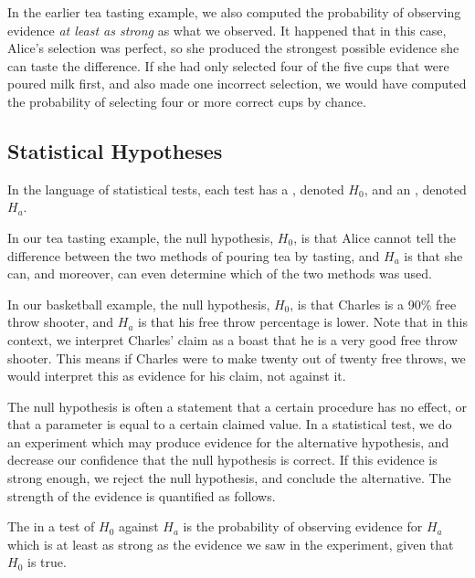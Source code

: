 \begin{note}
In the earlier tea tasting example, we also computed the probability of observing evidence \emph{at least as strong} as what we observed. It happened that in this case, Alice's selection was perfect, so she produced the strongest possible evidence she can taste the difference. If she had only selected four of the five cups that were poured milk first, and also made one incorrect selection, we would have computed the probability of selecting four or more correct cups by chance.
\end{note}

\subsection*{Statistical Hypotheses}

In the language of statistical tests, each test has a , denoted $H_0$, and an , denoted $H_a$.

In our tea tasting example, the null hypothesis, $H_0$, is that Alice cannot tell the difference between the two methods of pouring tea by tasting, and $H_a$ is that she can, and moreover, can even determine which of the two methods was used.

In our basketball example, the null hypothesis, $H_0$, is that Charles is a 90\% free throw shooter, and $H_a$ is that his free throw percentage is lower. Note that in this context, we interpret Charles' claim as a boast that he is a very good free throw shooter. This means if Charles were to make twenty out of twenty free throws, we would interpret this as evidence for his claim, not against it. 

The null hypothesis is often a statement that a certain procedure has no effect, or that a parameter is equal to a certain claimed value. In a statistical test, we do an experiment which may produce evidence for the alternative hypothesis, and decrease our confidence that the null hypothesis is correct. If this evidence is strong enough, we reject the null hypothesis, and conclude the alternative. The strength of the evidence is quantified as follows.

\begin{definition}
The  in a test of $H_0$ against $H_a$ is the probability of observing evidence for $H_a$ which is at least as strong as the evidence we saw in the experiment, given that $H_0$ is true.
\end{definition}

